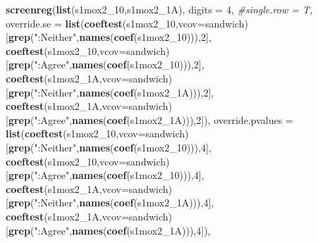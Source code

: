 \documentclass[
]{article}
\newenvironment{Shaded}{\begin{snugshade}}{\end{snugshade}}
\newcommand{\CommentTok}[1]{\textcolor[rgb]{0.56,0.35,0.01}{\textit{#1}}}
\newcommand{\DataTypeTok}[1]{\textcolor[rgb]{0.13,0.29,0.53}{#1}}
\newcommand{\DecValTok}[1]{\textcolor[rgb]{0.00,0.00,0.81}{#1}}
\newcommand{\KeywordTok}[1]{\textcolor[rgb]{0.13,0.29,0.53}{\textbf{#1}}}
\newcommand{\NormalTok}[1]{#1}
\newcommand{\StringTok}[1]{\textcolor[rgb]{0.31,0.60,0.02}{#1}}
\begin{document}
\begin{Shaded}
\begin{Highlighting}[]
\KeywordTok{screenreg}\NormalTok{(}\KeywordTok{list}\NormalTok{(s1mox2_}\DecValTok{10}\NormalTok{,s1mox2_1A), }\DataTypeTok{digits =} \DecValTok{4}\NormalTok{, }\CommentTok{#single.row = T,}
          \DataTypeTok{override.se =} \KeywordTok{list}\NormalTok{(}\KeywordTok{coeftest}\NormalTok{(s1mox2_}\DecValTok{10}\NormalTok{,}\DataTypeTok{vcov=}\NormalTok{sandwich)[}\KeywordTok{grep}\NormalTok{(}\StringTok{":Neither"}\NormalTok{,}\KeywordTok{names}\NormalTok{(}\KeywordTok{coef}\NormalTok{(s1mox2_}\DecValTok{10}\NormalTok{))),}\DecValTok{2}\NormalTok{],}
                             \KeywordTok{coeftest}\NormalTok{(s1mox2_}\DecValTok{10}\NormalTok{,}\DataTypeTok{vcov=}\NormalTok{sandwich)[}\KeywordTok{grep}\NormalTok{(}\StringTok{":Agree"}\NormalTok{,}\KeywordTok{names}\NormalTok{(}\KeywordTok{coef}\NormalTok{(s1mox2_}\DecValTok{10}\NormalTok{))),}\DecValTok{2}\NormalTok{],}
                             \KeywordTok{coeftest}\NormalTok{(s1mox2_1A,}\DataTypeTok{vcov=}\NormalTok{sandwich)[}\KeywordTok{grep}\NormalTok{(}\StringTok{":Neither"}\NormalTok{,}\KeywordTok{names}\NormalTok{(}\KeywordTok{coef}\NormalTok{(s1mox2_1A))),}\DecValTok{2}\NormalTok{],}
                             \KeywordTok{coeftest}\NormalTok{(s1mox2_1A,}\DataTypeTok{vcov=}\NormalTok{sandwich)[}\KeywordTok{grep}\NormalTok{(}\StringTok{":Agree"}\NormalTok{,}\KeywordTok{names}\NormalTok{(}\KeywordTok{coef}\NormalTok{(s1mox2_1A))),}\DecValTok{2}\NormalTok{]),}
          \DataTypeTok{override.pvalues =} \KeywordTok{list}\NormalTok{(}\KeywordTok{coeftest}\NormalTok{(s1mox2_}\DecValTok{10}\NormalTok{,}\DataTypeTok{vcov=}\NormalTok{sandwich)[}\KeywordTok{grep}\NormalTok{(}\StringTok{":Neither"}\NormalTok{,}\KeywordTok{names}\NormalTok{(}\KeywordTok{coef}\NormalTok{(s1mox2_}\DecValTok{10}\NormalTok{))),}\DecValTok{4}\NormalTok{],}
                                  \KeywordTok{coeftest}\NormalTok{(s1mox2_}\DecValTok{10}\NormalTok{,}\DataTypeTok{vcov=}\NormalTok{sandwich)[}\KeywordTok{grep}\NormalTok{(}\StringTok{":Agree"}\NormalTok{,}\KeywordTok{names}\NormalTok{(}\KeywordTok{coef}\NormalTok{(s1mox2_}\DecValTok{10}\NormalTok{))),}\DecValTok{4}\NormalTok{],}
                                  \KeywordTok{coeftest}\NormalTok{(s1mox2_1A,}\DataTypeTok{vcov=}\NormalTok{sandwich)[}\KeywordTok{grep}\NormalTok{(}\StringTok{":Neither"}\NormalTok{,}\KeywordTok{names}\NormalTok{(}\KeywordTok{coef}\NormalTok{(s1mox2_1A))),}\DecValTok{4}\NormalTok{],}
                                  \KeywordTok{coeftest}\NormalTok{(s1mox2_1A,}\DataTypeTok{vcov=}\NormalTok{sandwich)[}\KeywordTok{grep}\NormalTok{(}\StringTok{":Agree"}\NormalTok{,}\KeywordTok{names}\NormalTok{(}\KeywordTok{coef}\NormalTok{(s1mox2_1A))),}\DecValTok{4}\NormalTok{]),}

\end{Highlighting}
\end{Shaded}
\end{document}
